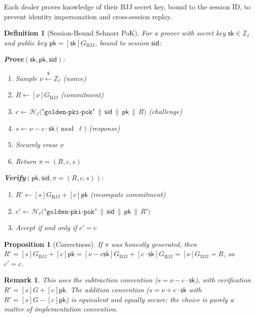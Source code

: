 \documentclass[11pt,a4paper]{article}
\newtheorem{definition}{Definition}[section]
\newtheorem{proposition}[theorem]{Proposition}
\newtheorem{remark}{Remark}[section]
\newcommand{\Z}{\mathbb{Z}}
\newcommand{\Fl}{\Z_\ell}
\newcommand{\genbjj}{G_{\mathrm{BJJ}}}
\newcommand{\sk}{\mathsf{sk}}
\newcommand{\pk}{\mathsf{pk}}
\newcommand{\sid}{\mathsf{sid}}
\newcommand{\hash}{\mathcal{H}}
\newcommand{\getsr}{\xleftarrow{\$}}
\begin{document}
Each dealer proves knowledge of their BJJ secret key, bound to the session ID,
to prevent identity impersonation and cross-session replay.

\begin{definition}[Session-Bound Schnorr PoK]
  \label{def:schnorr}
  For a prover with secret key $\sk \in \Fl$ and public key
  $\pk = [\sk]\genbjj$, bound to session $\sid$:

  \medskip
  \textbf{Prove}$(\sk, \pk, \sid)$:
  \begin{enumerate}[nosep]
    \item Sample $\nu \getsr \Fl$ \hfill (nonce)
    \item $R \leftarrow [\nu]\genbjj$ \hfill (commitment)
    \item $c \leftarrow \hash_\ell\bigl(\texttt{"golden-pki-pok"} \,\|\, \sid \,\|\, \pk \,\|\, R\bigr)$
          \hfill (challenge)
    \item $s \leftarrow \nu - c \cdot \sk \pmod{\ell}$ \hfill (response)
    \item Securely erase $\nu$
    \item Return $\pi = (R, c, s)$
  \end{enumerate}

  \medskip
  \textbf{Verify}$(\pk, \sid, \pi = (R, c, s))$:
  \begin{enumerate}[nosep]
    \item $R' \leftarrow [s]\genbjj + [c]\pk$ \hfill (recompute commitment)
    \item $c' \leftarrow \hash_\ell\bigl(\texttt{"golden-pki-pok"} \,\|\, \sid \,\|\, \pk \,\|\, R'\bigr)$
    \item Accept if and only if $c' = c$
  \end{enumerate}
\end{definition}

\begin{proposition}[Correctness]
  If $\pi$ was honestly generated, then
  $R' = [s]\genbjj + [c]\pk = [\nu - c\sk]\genbjj + [c \cdot \sk]\genbjj = [\nu]\genbjj = R$,
  so $c' = c$.
\end{proposition}

\begin{remark}
  This uses the \emph{subtraction} convention ($s = \nu - c \cdot \sk$), with
  verification $R' = [s]G + [c]\pk$. The addition convention
  ($s = \nu + c \cdot \sk$ with $R' = [s]G - [c]\pk$) is equivalent and
  equally secure; the choice is purely a matter of implementation convention.
\end{remark}
\end{document}
